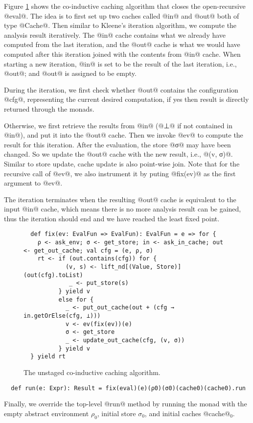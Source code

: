 Figure \ref{fig:coind_cache} shows the co-inductive caching algorithm that
closes the open-recursive @eval@.
The idea is to first set up two caches called @in@ and @out@ both of type
@Cache@. Then similar to Kleene's iteration algorithm, we compute the analysis
result iteratively. The @in@ cache contains what we already have computed from
the last iteration, and the @out@ cache is what we would have computed after this
iteration joined with the contents from @in@ cache.
When starting a new iteration, @in@ is set to be the result of the last
iteration, i.e., @out@; and @out@ is assigned to be empty.

During the iteration, we first check whether @out@ contains the configuration
@cfg@, representing the current desired computation, if
yes then result is directly returned through the monads.

Otherwise, we first retrieve the results from @in@ (@⊥@ if not contained in
@in@), and put it into the @out@ cache.
Then we invoke @ev@ to compute the result for this iteration.
After the evaluation, the store @σ@ may have been changed. So we update the
@out@ cache with the new result, i.e., @(v, σ)@. Similar to store update, cache
update is also point-wise join.
Note that for the recursive call of @ev@, we also instrument it by puting
@fix(ev)@ as the first argument to @ev@.

The iteration terminates when the resulting @out@ cache is equivalent to the
input @in@ cache, which means there is no more analysis result can be gained,
thus the iteration should end and we have reached the least fixed point.

\begin{figure}[t!]
  \centering
\begin{lstlisting}
  def fix(ev: EvalFun => EvalFun): EvalFun = e => for {
    ρ <- ask_env; σ <- get_store; in <- ask_in_cache; out <- get_out_cache; val cfg = (e, ρ, σ)
    rt <- if (out.contains(cfg)) for {
            (v, s) <- lift_nd[(Value, Store)](out(cfg).toList)
             _ <- put_store(s)
          } yield v
          else for {
            _ <- put_out_cache(out + (cfg → in.getOrElse(cfg, ⊥)))
            v <- ev(fix(ev))(e)
            σ <- get_store
            _ <- update_out_cache(cfg, (v, σ))
          } yield v
  } yield rt
\end{lstlisting}
\vspace{-1em}
\caption{The unstaged co-inductive caching algorithm.}
\label{fig:coind_cache}
\end{figure}

\begin{lstlisting}
  def run(e: Expr): Result = fix(eval)(e)(ρ0)(σ0)(cache0)(cache0).run
\end{lstlisting}

Finally, we override the top-level @run@ method by running the monad with
the empty abstract environment $\rho_0$, initial store $\sigma_0$, and initial
caches @cache@$_0$.
